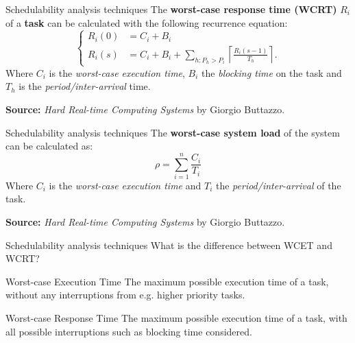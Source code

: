 \begin{frame}{Schedulability analysis techniques}
    The \textbf{worst-case response time (WCRT)} $R_i$ of a \textbf{task} can be calculated with
    the following recurrence equation:
    \begin{equation}
        \begin{cases}
            R_{i}(0) &= C_i + B_i \\
            R_{i}(s) &= C_i + B_i + \sum\limits_{h: P_h > P_i} \left\lceil \frac{R_{i}(s-1)}{T_h} \right\rceil.
        \end{cases}
    \end{equation}
    Where $C_i$ is the \emph{worst-case execution time}, $B_i$ the
    \emph{blocking time} on the task and $T_h$ is the \emph{period/inter-arrival} time.
    \vspace{1em}

    \textbf{Source:} \emph{Hard Real-time Computing Systems} by Giorgio Buttazzo.
\end{frame}

\begin{frame}{Schedulability analysis techniques}
    The \textbf{worst-case system load} of the system can be calculated as:
    \begin{equation}
        \rho = \sum^{n}_{i=1} \frac{C_i}{T_i}
    \end{equation}
    Where $C_i$ is the \emph{worst-case execution time} and $T_i$ the
    \emph{period/inter-arrival} of the task.
    \vspace{1em}

    \textbf{Source:} \emph{Hard Real-time Computing Systems} by Giorgio Buttazzo.
\end{frame}

\begin{frame}{Schedulability analysis techniques}
    What is the difference between WCET and WCRT?
    \vspace{1em}

    \begin{block}{Worst-case Execution Time}
        The maximum possible execution time of a task, without any
        interruptions from e.g. higher priority tasks.
    \end{block}

    \vspace{1em}

    \begin{block}{Worst-case Response Time}
        The maximum possible execution time of a task, with all
        possible interruptions such as blocking time considered.
    \end{block}
\end{frame}

